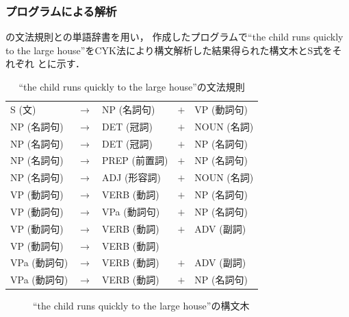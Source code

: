 \documentclass[uplatex, dvipdfmx, a4paper, twocolumn]{jsarticle}
\begin{document}
      \subsubsection{プログラムによる解析}
      の文法規則との単語辞書を用い，
      作成したプログラムで``the child runs quickly to the large house''をCYK法により構文解析した結果得られた構文木とS式をそれぞれ
      とに示す．
      \begin{table}[htb]
        \centering
        \caption{``the child runs quickly to the large house''の文法規則}
        \label{tab:syntax_child}
        \begin{tabular}{l c l c l} \hline
          S (文) & $\to$ & NP (名詞句) & $+$ & VP (動詞句) \\
          NP (名詞句) & $\to$ & DET (冠詞) & $+$ & NOUN (名詞) \\
          NP (名詞句) & $\to$ & DET (冠詞) & $+$ & NP (名詞句) \\
          NP (名詞句) & $\to$ & PREP (前置詞) & $+$ & NP (名詞句) \\
          NP (名詞句) & $\to$ & ADJ (形容詞) & $+$ & NOUN (名詞) \\
          VP (動詞句) & $\to$ & VERB (動詞) & $+$ & NP (名詞句) \\
          VP (動詞句) & $\to$ & VPa (動詞句) & $+$ & NP (名詞句) \\
          VP (動詞句) & $\to$ & VERB (動詞) & $+$ & ADV (副詞) \\
          VP (動詞句) & $\to$ & VERB (動詞) & & \\
          VPa (動詞句) & $\to$ & VERB (動詞) & $+$ & ADV (副詞) \\
          VPa (動詞句) & $\to$ & VERB (動詞) & $+$ & NP (名詞句) \\ \hline
        \end{tabular}
      \end{table}
      \begin{figure}[htpb]
        \centering
        \caption{``the child runs quickly to the large house''の構文木}
        \label{fig:tree_child}      
      \end{figure}
\end{document}
